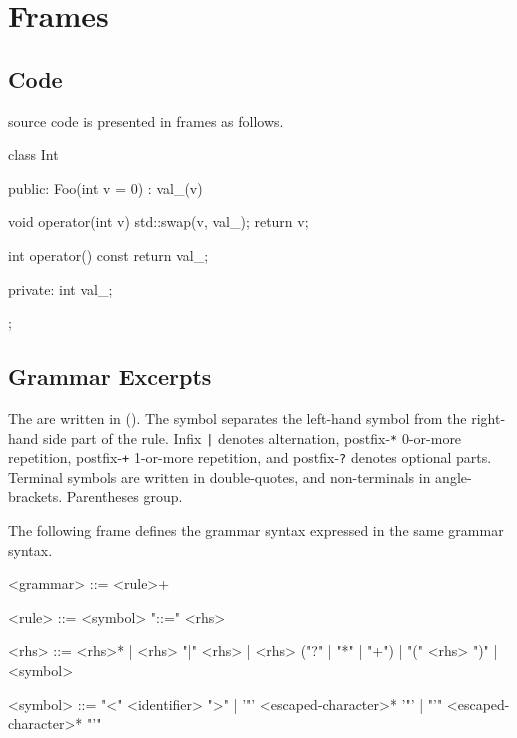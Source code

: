\section{Frames}

\subsection{\Cxx Code}
\label{sec:notations:cxx}

\Cxx source code is presented in frames as follows.

\begin{cxx}
class Int
{
public:
  Foo(int v = 0)
    : val_(v)
  {}

  void operator(int v)
  {
    std::swap(v, val_);
    return v;
  }

  int operator() const
  {
    return val_;
  }

private:
  int val_;
};
\end{cxx}

\subsection{Grammar Excerpts}
\label{sec:notations:bnf}

The  are written in  ().  The symbol \lstindex{::=} separates the left-hand
symbol from the right-hand side part of the rule.  Infix \lstinline{|}
denotes alternation, postfix-\lstinline{*} 0-or-more repetition,
postfix-\lstinline{+} 1-or-more repetition, and postfix-\lstinline{?}
denotes optional parts.  Terminal symbols are written in double-quotes, and
non-terminals in angle-brackets.  Parentheses group.

The following frame defines the grammar syntax expressed in the same grammar
syntax.

\begin{bnf}
<grammar> ::= <rule>+

<rule> ::= <symbol> "::=" <rhs>

<rhs> ::= <rhs>*
        | <rhs> "|" <rhs>
        | <rhs> ("?" | "*" | "+")
        | "(" <rhs> ")"
        | <symbol>

<symbol> ::= "<" <identifier> ">"
           | '"' <escaped-character>* '"'
           | "'" <escaped-character>* "'"
\end{bnf}


